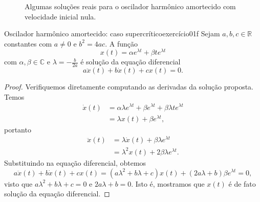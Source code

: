 \begin{figure}[!ht]
    \centering
    \caption{Algumas soluções reais para o oscilador harmônico amortecido com velocidade inicial nula.}
    \label{fig:exercício01}
\end{figure}

\begin{proposition}{Oscilador harmônico amortecido: caso supercrítico}{exercício01f}
    Sejam \(a,b,c \in \mathbb{R}\) constantes com \(a \neq 0\) e \(b^2 = 4ac\). A função
    \begin{equation*}
        x(t) = \alpha e^{\lambda t} + \beta t e^{\lambda t}
    \end{equation*}
    com \(\alpha, \beta \in \mathbb{C}\) e \(\lambda = -\frac{b}{2a}\) é solução da equação diferencial
    \begin{equation*}
        a\ddot{x}(t) + b\dot{x}(t) + cx(t) = 0.
    \end{equation*}
\end{proposition}
\begin{proof}
    Verifiquemos diretamente computando as derivadas da solução proposta. Temos
    \begin{align*}
        \dot{x}(t) &= \alpha \lambda e^{\lambda t} + \beta e^{\lambda t} + \beta \lambda t e^{\lambda t}\\
                   &= \lambda x(t) + \beta e^{\lambda t},
    \end{align*}
    portanto
    \begin{align*}
        \ddot{x}(t) &= \lambda \dot{x}(t) + \beta \lambda e^{\lambda t}\\
                    &= \lambda^2 x(t) + 2 \beta \lambda e^{\lambda t}.
    \end{align*}
    Substituindo na equação diferencial, obtemos
    \begin{equation*}
        a \ddot{x}(t) + b\dot{x}(t) + cx(t) = \left(a \lambda^2 + b \lambda + c\right)x(t) + (2a \lambda + b)\beta e^{\lambda t} = 0,
    \end{equation*}
    visto que \(a \lambda^2 + b \lambda + c = 0\) e \(2a \lambda + b = 0\). Isto é, mostramos que \(x(t)\) é de fato solução da equação diferencial.
\end{proof}
